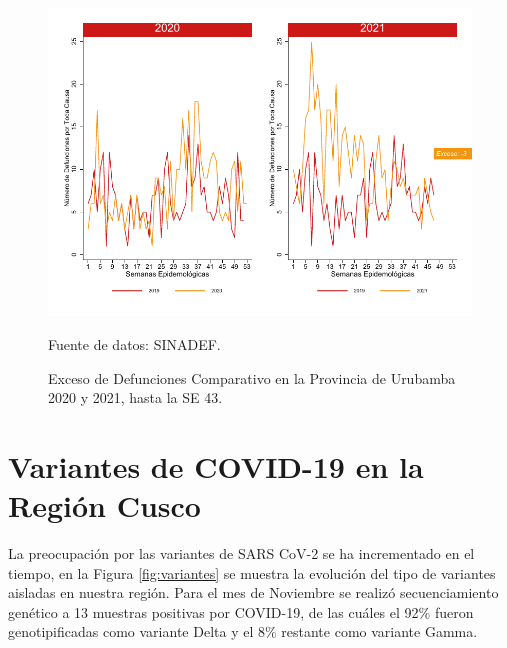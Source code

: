 \documentclass[12pt,a4paper,openany]{book}
\begin{document}
		\begin{figure}[h]
			\caption{Exceso de Defunciones Comparativo en la Provincia de Urubamba 2020 y 2021, hasta la SE 43.}\label{fig:exceso_urub}
			\begin{center}
				\includegraphics[width=0.7\linewidth]{../figuras/exceso_13}
			\end{center}
			{\footnotesize {Fuente de datos: SINADEF.}}
		\end{figure}
		
		\clearpage
		
		\clearpage
		
		\section* {Variantes de COVID-19 en la Región Cusco}
		\noindent La preocupación por las variantes de SARS CoV-2 se ha incrementado en el tiempo, en la Figura \ref{fig:variantes} se muestra la evolución del tipo de variantes aisladas en nuestra región. Para el mes de Noviembre se realizó secuenciamiento genético a 13 muestras positivas por COVID-19, de las cuáles el 92$\%$ fueron genotipificadas como variante Delta y el 8$\%$ restante como variante Gamma.
		
\end{document}
